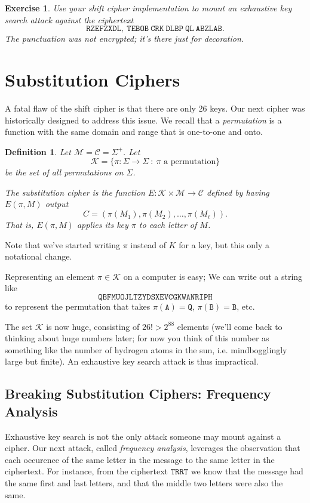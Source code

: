\documentclass[11pt]{article}
\newtheorem{exercise}{Exercise}
\newtheorem{definition}{Definition}
\newcommand{\msgs}{\mathcal{M}}
\newcommand{\ctxts}{\mathcal{C}}
\newcommand{\keys}{\mathcal{K}}
\newcommand{\enc}{E}
\begin{document}
\begin{exercise}
    Use your shift cipher implementation to mount an exhaustive key search
    attack against the ciphertext
    \[
        \mathtt{RZEFZXDL,\ TEBOB\ CRK\ DLBP\ QL\ ABZLAB.}
    \]
    The punctuation was not encrypted; it's there just for decoration.
\end{exercise}

\section{Substitution Ciphers}

A fatal flaw of the shift cipher is that there are only 26 keys.  Our next
cipher was historically designed to address this issue.  We recall that a
\emph{permutation} is a function with the same domain and range that is
one-to-one and onto.

\begin{definition}
    Let $\msgs=\ctxts=\Sigma^+$. 
    Let
    \[
        \keys = \{ \pi:\Sigma\to\Sigma \ :\  \pi\text{ a permutation}\}
    \]
    be the set of all permutations on $\Sigma$.

    The \emph{substitution cipher} is the function
    $\enc:\keys\times\msgs\to\ctxts$ defined by having $\enc(\pi,M)$ output 
    \[
        C = (\pi(M_1),\pi(M_2),\ldots,\pi(M_\ell)).
    \]
    That is, $\enc(\pi,M)$ applies its key $\pi$ to each letter of $M$.
\end{definition}
Note that we've started writing $\pi$ instead of $K$ for a key, but this
only a notational change.

Representing an element $\pi\in\keys$ on a computer is easy; We can write out
a string like
\[
    \mathtt{QBFMUOJLTZYDSXEVCGKWANRIPH}
\]
to represent the permutation that takes $\pi(\mathtt{A})=\mathtt{Q}$,
$\pi(\mathtt{B})=\mathtt{B}$, etc.

The set $\keys$ is now huge, consisting of $26! > 2^{88}$ elements (we'll come
back to thinking about huge numbers later; for now you think of this number as
something like the number of hydrogen atoms in the sun, i.e. mindbogglingly
large but finite). An exhaustive key search attack is thus impractical.

\subsection{Breaking Substitution Ciphers: Frequency Analysis}

Exhaustive key search is not the only attack someone may mount against a
cipher. Our next attack, called \emph{frequency analysis}, leverages the
observation that each occurence of the same letter in the message  to the
same letter in the ciphertext. For instance, from the ciphertext
$\mathtt{TRRT}$ we know that the message had the same first and last
letters, and that the middle two letters were also the same.
\end{document}
